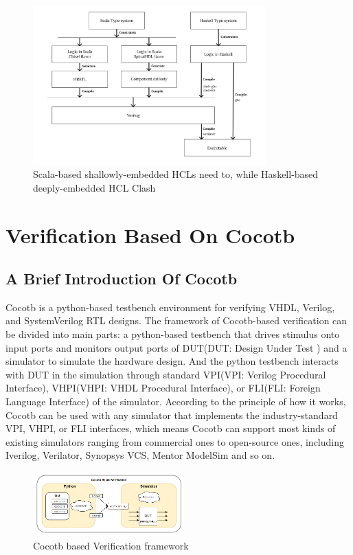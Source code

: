 \documentclass{article}
\begin{document}
\begin{figure}[hbt]
\centering
\includegraphics[width=0.8\textwidth]{Frame_1(3).png}
\caption{\label{fig:frame3}Scala-based shallowly-embedded HCLs need to, while Haskell-based deeply-embedded HCL Clash }
\end{figure}



\section{Verification Based On Cocotb\cite{rosser2018cocotb}}
\subsection{A Brief Introduction Of Cocotb}
Cocotb is a python-based testbench environment for verifying VHDL, Verilog, and SystemVerilog RTL designs\cite{cocotb_doc}. The framework of Cocotb-based verification can be divided into main parts: a python-based testbench that drives stimulus onto input ports and monitors output ports of DUT(DUT: Design Under Test ) and a simulator to simulate the hardware design. And the python testbench interacts with DUT in the simulation through standard VPI(VPI: Verilog Procedural Interface), VHPI(VHPI: VHDL Procedural Interface), or FLI(FLI: Foreign Language Interface) of the simulator. According to the principle of how it works, Cocotb can be used with any simulator that implements the industry-standard VPI, VHPI, or FLI interfaces, which means Cocotb can support most kinds of existing simulators ranging from commercial ones to open-source ones, including Iverilog, Verilator, Synopsys VCS, Mentor ModelSim and so on.

\begin{figure}[h]
\centering
\includegraphics[width=0.52\textwidth]{cocotb.png}
\caption{\label{fig:coco}Cocotb based Verification framework}
\end{figure}
\end{document}
